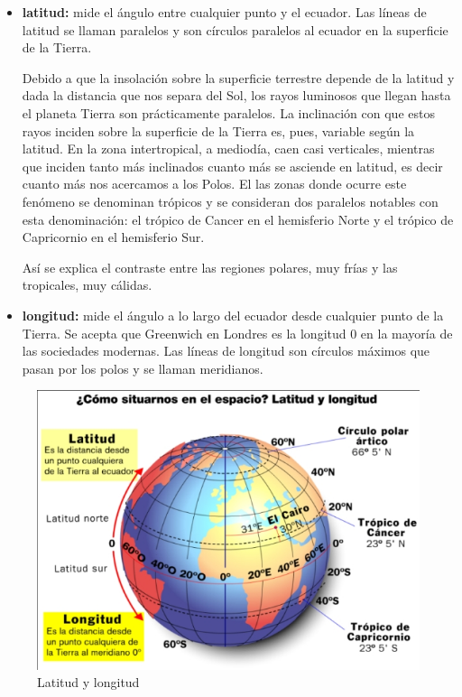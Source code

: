 \begin{itemize}
\item {\bf\Gls{latitud}:} mide el \'angulo entre cualquier punto y el ecuador. Las
  l\'ineas de latitud se llaman paralelos y son c\'irculos paralelos al
  ecuador en la superficie de la Tierra.

Debido a   que 
la insolaci\'on sobre la superficie terrestre depende de la latitud y dada la distancia que
  nos separa del Sol, los rayos luminosos que llegan hasta el planeta Tierra 
  son pr\'acticamente paralelos. La inclinaci\'on con que estos rayos
  inciden sobre la superficie de la Tierra es, pues, variable seg\'un la
  latitud. En la zona intertropical, a mediod\'ia, caen casi verticales,
  mientras que inciden tanto m\'as inclinados cuanto m\'as se asciende en
  latitud, es decir cuanto m\'as nos acercamos a los Polos. El las zonas donde ocurre este fen\'omeno se denominan tr\'opicos y se consideran dos paralelos notables con esta denominaci\'on: el tr\'opico de Cancer en el hemisferio Norte y el tr\'opico de Capricornio en el hemisferio Sur. %

As\'i se
  explica el contraste entre las regiones polares, muy fr\'ias y las
  tropicales, muy c\'alidas.


\item {\bf \Gls{longitud}:} mide el \'angulo a lo largo del ecuador desde cualquier   punto de la Tierra. Se acepta que Greenwich en Londres es la
  longitud 0 en la mayor\'ia de las sociedades modernas. Las l\'ineas de
  longitud son c\'irculos m\'aximos que pasan por los polos y se llaman
  meridianos.
\end{itemize}



\begin{figure}[!h]
  \centering
  \includegraphics[width=\textwidth]{06.radionavegacion/Imagenes/latitud_longitud.jpg}
  \caption{Latitud y longitud}
  \label{fig:latitud-longitud}
\end{figure}


